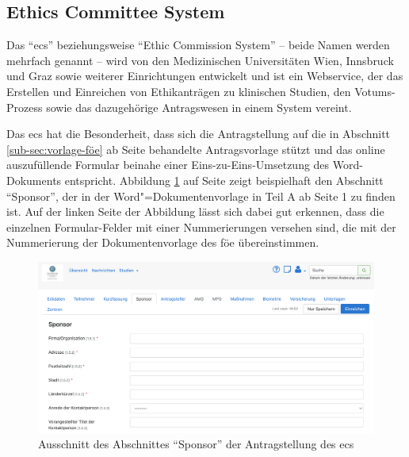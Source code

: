 \documentclass[a4paper,12pt,twoside]{scrreprt}
\begin{document}
\subsection{Ethics Committee System}
\label{sub-sec:ecs}

Das \enquote{\ac{ecs}} beziehungsweise \enquote{Ethic Commission System} -- beide Namen werden mehrfach genannt -- wird von den Medizinischen Universitäten Wien, Innsbruck und Graz sowie weiterer Einrichtungen entwickelt und ist ein Webservice, der das Erstellen und Einreichen von Ethikanträgen zu klinischen Studien, den Votums-Prozess sowie das dazugehörige Antragswesen in einem System vereint. \cite{medizinische_universitat_wien_ecs-docs_about-2021}

\medskip

Das \ac{ecs} hat die Besonderheit, dass sich die Antragstellung auf die in Abschnitt \ref{sub-sec:vorlage-föe} ab Seite \pageref{sub-sec:vorlage-föe} behandelte Antragsvorlage stützt und das online auszufüllende Formular beinahe einer Eins-zu-Eins-Umsetzung des Word-Dokuments entspricht. Abbildung \ref{fig:abschnitt-sponsor-ecs} auf Seite \pageref{fig:abschnitt-sponsor-ecs} zeigt beispielhaft den Abschnitt \enquote{Sponsor}, der in der Word"=Dokumentenvorlage in Teil A ab Seite 1 zu finden ist. Auf der linken Seite der Abbildung lässt sich dabei gut erkennen, dass die einzelnen Formular-Felder mit einer Nummerierungen versehen sind, die mit der Nummerierung der Dokumentenvorlage des \ac{föe} übereinstimmen.

\begin{figure}[ht]
    \centering
    \includegraphics[width=\linewidth]{thesis/images/Luidold_ECS-Schritt-Eckdaten.png}
    \caption[Ausschnitt des Abschnittes \enquote{Sponsor} der Antragstellung des \acl{ecs}]{Ausschnitt des Abschnittes \enquote{Sponsor} der Antragstellung des \acl{ecs} \cite{ethikkommission_der_medizinischen_universitat_innsbruck_ethikkommission_2023}}
    \label{fig:abschnitt-sponsor-ecs}
\end{figure}
\end{document}
